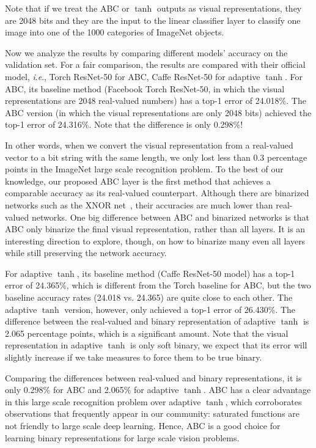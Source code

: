 \documentclass[runningheads]{llncs}
\newcommand{\ie}{\textit{i}.\textit{e}.}
\begin{document}
Note that if we treat the ABC or $\tanh$ outputs as visual representations, they are 2048 bits and they are the input to the linear classifier layer to classify one image into one of the 1000 categories of ImageNet objects.

Now we analyze the results by comparing different models' accuracy on the validation set. For a fair comparison, the results are compared with their official model, \ie, Torch ResNet-50 for ABC, Caffe ResNet-50 for adaptive $\tanh$. For ABC, its baseline method (Facebook Torch ResNet-50, in which the visual representations are 2048 real-valued numbers) has a top-1 error of 24.018\%. The ABC version (in which the visual representations are only 2048 bits) achieved the top-1 error of 24.316\%. Note that the difference is only 0.298\%!

In other words, when we convert the visual representation from a real-valued vector to a bit string with the same length, we only lost less than 0.3 percentage points in the ImageNet large scale recognition problem. To the best of our knowledge, our proposed ABC layer is the first method that achieves a comparable accuracy as its real-valued counterpart. Although there are binarized networks such as the XNOR net~\cite{Rastegari16ECCV}, their accuracies are much lower than real-valued networks. One big difference between ABC and binarized networks is that ABC only binarize the final visual representation, rather than all layers. It is an interesting direction to explore, though, on how to binarize many even all layers while still preserving the network accuracy.

For adaptive $\tanh$, its baseline method (Caffe ResNet-50 model) has a top-1 error of 24.365\%, which is different from the Torch baseline for ABC, but the two baseline accuracy rates (24.018 vs. 24.365) are quite close to each other. The adaptive $\tanh$ version, however, only achieved a top-1 error of 26.430\%. The difference between the real-valued and binary representation of adaptive $\tanh$ is 2.065 percentage points, which is a significant amount. Note that the visual representation in adaptive $\tanh$ is only soft binary, we expect that its error will slightly increase if we take measures to force them to be true binary.

Comparing the differences between real-valued and binary representations, it is only 0.298\% for ABC and 2.065\% for adaptive $\tanh$. ABC has a clear advantage in this large scale recognition problem over adaptive $\tanh$, which corroborates observations that frequently appear in our community: saturated functions are not friendly to large scale deep learning. Hence, ABC is a good choice for learning binary representations for large scale vision problems.
\end{document}
